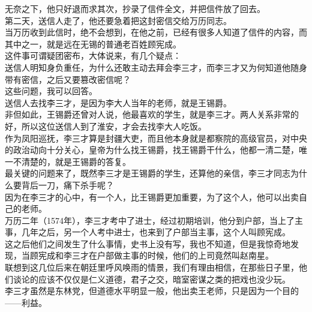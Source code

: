 \begin{multicols}{\theparacolNo}
无奈之下，他只好退而求其次，抄录了信件全文，并把信件放了回去。\\

第二天，送信人走了，他还要急着把这封密信交给万历同志。\\

当万历收到此信时，绝不会想到，在他之前，已经有很多人知道了信件的内容，而其中之一，就是远在无锡的普通老百姓顾宪成。\\

这件事可谓疑团密布，大体说来，有几个疑点：\\

送信人明知身负重任，为什么还敢主动去拜会李三才，而李三才又为何知道他随身带有密信，之后又要篡改密信呢？\\

这些问题，我可以回答。\\

送信人去找李三才，是因为李大人当年的老师，就是王锡爵。\\

非但如此，王锡爵还曾对人说，他最喜欢的学生，就是李三才。两人关系非常的好，所以这位送信人到了淮安，才会去找李大人吃饭。\\

作为凤阳巡抚，李三才算是封疆大吏，而且他本身就是都察院的高级官员，对中央的政治动向十分关心，皇帝为什么找王锡爵，找王锡爵干什么，他都一清二楚，唯一不清楚的，就是王锡爵的答复。\\

最关键的问题来了，既然李三才是王锡爵的学生，还算他的亲信，李三才同志为什么要背后一刀，痛下杀手呢？\\

因为在李三才的心中，有一个人，比王锡爵更加重要，为了这个人，他可以出卖自己的老师。\\

万历二年（1574年），李三才考中了进士，经过初期培训，他分到户部，当上了主事，几年之后，另一个人考中进士，也来到了户部当主事，这个人叫顾宪成。\\

这之后他们之间发生了什么事情，史书上没有写，我也不知道，但是我惊奇地发现，当顾宪成和李三才在户部做主事的时候，他们的上司竟然叫赵南星。\\

联想到这几位后来在朝廷里呼风唤雨的情景，我们有理由相信，在那些日子里，他们谈论的应该不仅仅是仁义道德，君子之交，暗室密谋之类的把戏也没少玩。\\

李三才虽然是东林党，但道德水平明显一般，他出卖王老师，只是因为一个目的——利益。\\


\end{multicols}

